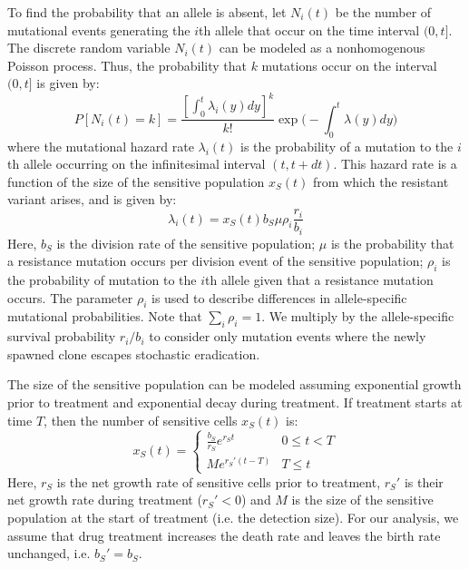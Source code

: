 \documentclass{article}
\begin{document}
To find the probability that an allele is absent, let $N_i(t)$ be the number of mutational events generating the $i$th allele that occur on the time interval $(0,t]$.  The discrete random variable $N_i(t)$ can be modeled as a nonhomogenous Poisson process.  Thus, the probability that $k$ mutations occur on the interval $(0,t]$ is given by:
\begin{equation}
P[N_i(t)=k] = \frac{[\int_0^t \lambda_i(y) dy]^k}{k!} \exp\Bigg(-\int_0^t \lambda(y) dy\Bigg)
\end{equation}
where the mutational hazard rate $\lambda_i(t)$ is the probability of a mutation to the $i$th allele occurring on the infinitesimal interval $(t,t+dt)$.  This hazard rate is a function of the size of the sensitive population $x_S(t)$ from which the resistant variant arises, and is given by:
\begin{equation}
\lambda_i(t) = x_S(t) b_S \mu \rho_i \frac{r_i}{b_i}
\end{equation}
Here, $b_S$ is the division rate of the sensitive population; $\mu$ is the probability that a resistance mutation occurs per division event of the sensitive population; $\rho_i$ is the probability of mutation to the $i$th allele given that a resistance mutation occurs.  The parameter $\rho_i$ is used to describe differences in allele-specific mutational probabilities.  Note that $\sum_i \rho_i = 1$.  We multiply by the allele-specific survival probability $r_i/b_i$ to consider only mutation events where the newly spawned clone escapes stochastic eradication.

The size of the sensitive population can be modeled assuming exponential growth prior to treatment and exponential decay during treatment.  If treatment starts at time $T$, then the number of sensitive cells $x_S(t)$ is:
\begin{equation}
x_S(t) = \begin{cases} 
          \frac{b_S}{r_S}e^{r_St} & 0\leq t < T \\
          Me^{r_S'(t-T)} & T\leq t
       \end{cases}
\end{equation}
Here, $r_S$ is the net growth rate of sensitive cells prior to treatment, $r_S'$ is their net growth rate during treatment ($r_S'<0$) and $M$ is the size of the sensitive population at the start of treatment (i.e. the detection size).  For our analysis, we assume that drug treatment increases the death rate and leaves the birth rate unchanged, i.e. $b_S' = b_S$.
\end{document}
